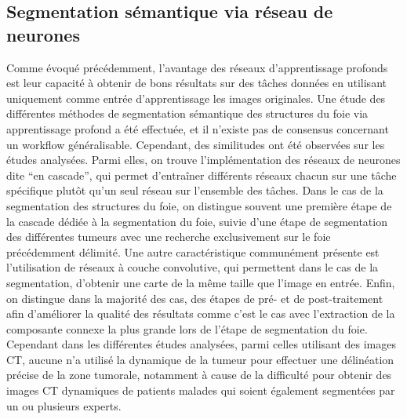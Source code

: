 \documentclass[]{memoir}
\begin{document}
\subsection{Segmentation sémantique via réseau de neurones}
Comme évoqué précédemment, l’avantage des réseaux d’apprentissage profonds est leur capacité à obtenir de bons résultats sur des tâches données en utilisant uniquement comme entrée d’apprentissage les images originales.
Une étude des différentes méthodes de segmentation sémantique des structures du foie via apprentissage profond a été effectuée, et il n’existe pas de consensus concernant un workflow généralisable. Cependant, des similitudes ont été observées sur les études analysées.
Parmi elles, on trouve l’implémentation des réseaux de neurones dite “en cascade”, qui permet d’entraîner différents réseaux chacun sur une tâche spécifique plutôt qu’un seul réseau sur l’ensemble des tâches. Dans le cas de la segmentation des structures du foie, on distingue souvent une première étape de la cascade dédiée à la segmentation du foie, suivie d’une étape de segmentation des différentes tumeurs avec une recherche exclusivement sur le foie précédemment délimité.  Une autre caractéristique communément présente est l’utilisation de réseaux à couche convolutive, qui permettent dans le cas de la segmentation, d’obtenir une carte de la même taille que l’image en entrée.
Enfin, on distingue dans la majorité des cas, des étapes de pré- et de post-traitement afin d’améliorer la qualité des résultats comme c’est le cas avec l’extraction de la composante connexe la plus grande lors de l’étape de segmentation du foie.
Cependant dans les différentes études analysées, parmi celles utilisant des images CT, aucune n’a utilisé la dynamique de la tumeur pour effectuer une délinéation précise de la zone tumorale, notamment à cause de la difficulté pour obtenir des images CT dynamiques de patients malades qui soient également segmentées par un ou plusieurs experts.
\end{document}
